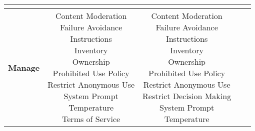 \documentclass[fleqn]{article}
\begin{document}
\begin{landscape}
\begin{table}[H]
\begin{tabular}{|c|c|c|c|c|}
{		}
		& \\ 
		\hline		
		\textbf{Manage} 
		& \makecell[l]{ 		
			\textbullet\hspace{3pt} Content Moderation\\ 		
			\textbullet\hspace{3pt} Failure Avoidance\\ 	
			\textbullet\hspace{3pt} Instructions\\ 	
			\textbullet\hspace{3pt} Inventory\\ 	
			\textbullet\hspace{3pt} Ownership\\ 
			\textbullet\hspace{3pt} Prohibited Use Policy\\ 	
			\textbullet\hspace{3pt} Restrict Anonymous Use\\ 			
			\textbullet\hspace{3pt} System Prompt\\ 	
			\textbullet\hspace{3pt} Temperature\\ 	
			\textbullet\hspace{3pt} Terms of Service\\ 	
		} 
		& \makecell[l]{ 	
			\textbullet\hspace{3pt} Content Moderation\\		
			\textbullet\hspace{3pt} Failure Avoidance\\ 	
			\textbullet\hspace{3pt} Instructions\\ 	
			\textbullet\hspace{3pt} Inventory\\ 	
			\textbullet\hspace{3pt} Ownership\\ 
			\textbullet\hspace{3pt} Prohibited Use Policy\\ 	
			\textbullet\hspace{3pt} Restrict Anonymous Use\\ 
			\textbullet\hspace{3pt} Restrict Decision Making\\  						
			\textbullet\hspace{3pt} System Prompt\\ 	
			\textbullet\hspace{3pt} Temperature\\ 	
}
\end{tabular}
\end{table}
\end{landscape}
\end{document}
